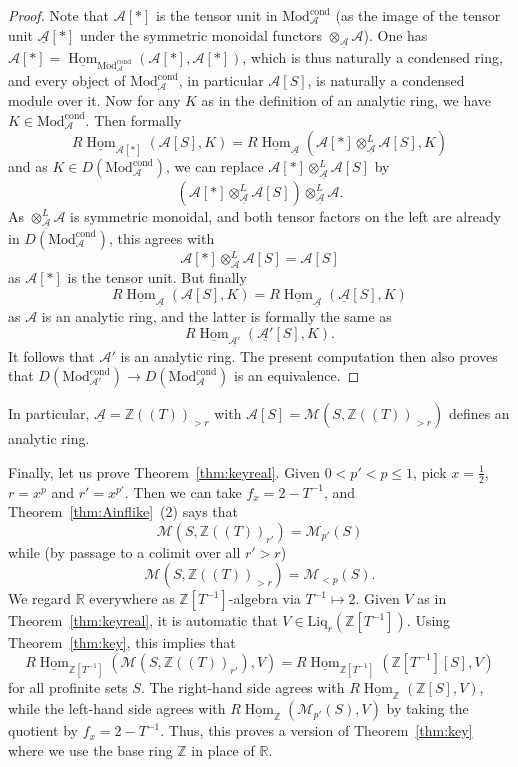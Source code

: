 \documentclass[11pt]{amsbook}
\DeclareMathOperator{\Hom}{Hom}
\newcommand{\intHom}{\underline{\Hom}}
\newcommand{\CondMod}{\mathrm{Mod}^{\mathrm{cond}}}
\numberwithin{equation}{section}
\numberwithin{theorem}{section}
\theoremstyle{definition}
\begin{document}
\begin{proof} Note that $\mathcal A[\ast]$ is the tensor unit in $\CondMod_{\mathcal A}$ (as the image of the tensor unit $\underline{\mathcal A}[\ast]$ under the symmetric monoidal functors $\otimes_{\underline{\mathcal A}} \mathcal A$). One has $\mathcal A[\ast] = \intHom_{\CondMod_{\mathcal A}}(\mathcal A[\ast],\mathcal A[\ast])$, which is thus naturally a condensed ring, and every object of $\CondMod_{\mathcal A}$, in particular $\mathcal A[S]$, is naturally a condensed module over it. Now for any $K$ as in the definition of an analytic ring, we have $K\in \CondMod_{\mathcal A}$. Then formally
\[
R\intHom_{\mathcal A[\ast]}(\mathcal A[S],K) = R\intHom_{\underline{\mathcal A}}(\mathcal A[\ast]\otimes^L_{\underline{\mathcal A}} \mathcal A[S],K)
\]
and as $K\in D(\CondMod_{\mathcal A})$, we can replace $\mathcal A[\ast]\otimes^L_{\underline{\mathcal A}} \mathcal A[S]$ by
\[
(\mathcal A[\ast]\otimes^L_{\underline{\mathcal A}} \mathcal A[S])\otimes^L_{\underline{\mathcal A}} \mathcal A.
\]
As $\otimes^L_{\underline{\mathcal A}} \mathcal A$ is symmetric monoidal, and both tensor factors on the left are already in $D(\CondMod_{\mathcal A})$, this agrees with
\[
\mathcal A[\ast]\otimes^L_{\mathcal A} \mathcal A[S] = \mathcal A[S]
\]
as $\mathcal A[\ast]$ is the tensor unit. But finally
\[
R\intHom_{\underline{\mathcal A}}(\mathcal A[S],K) = R\intHom_{\underline{\mathcal A}}(\underline{\mathcal A}[S],K)
\]
as $\mathcal A$ is an analytic ring, and the latter is formally the same as
\[
R\intHom_{\underline{\mathcal A'}}(\underline{\mathcal A'}[S],K).
\]
It follows that $\mathcal A'$ is an analytic ring. The present computation then also proves that $D(\CondMod_{\mathcal A'})\to D(\CondMod_{\mathcal A})$ is an equivalence.
\end{proof}

In particular, $\underline{\mathcal A}=\mathbb Z((T))_{>r}$ with $\mathcal A[S] = \mathcal M(S,\mathbb Z((T))_{>r})$ defines an analytic ring.

Finally, let us prove Theorem~\ref{thm:keyreal}. Given $0<p'<p\leq 1$, pick $x=\tfrac 12$, $r=x^p$ and $r'=x^{p'}$. Then we can take $f_x=2-T^{-1}$, and Theorem~\ref{thm:Ainflike}~(2) says that
\[
\mathcal M(S,\mathbb Z((T))_{r'})=\mathcal M_{p'}(S)
\]
while (by passage to a colimit over all $r'>r$)
\[
\mathcal M(S,\mathbb Z((T))_{>r}) = \mathcal M_{<p}(S).
\]
We regard $\mathbb R$ everywhere as $\mathbb Z[T^{-1}]$-algebra via $T^{-1}\mapsto 2$. Given $V$ as in Theorem~\ref{thm:keyreal}, it is automatic that $V\in \mathrm{Liq}_r(\mathbb Z[T^{-1}])$. Using Theorem~\ref{thm:key}, this implies that
\[
R\intHom_{\mathbb Z[T^{-1}]}(\mathcal M(S,\mathbb Z((T))_{r'}),V) = R\intHom_{\mathbb Z[T^{-1}]}(\mathbb Z[T^{-1}][S],V)
\]
for all profinite sets $S$. The right-hand side agrees with $R\intHom_{\mathbb Z}(\mathbb Z[S],V)$, while the left-hand side agrees with $R\intHom_{\mathbb Z}(\mathcal M_{p'}(S),V)$ by taking the quotient by $f_x=2-T^{-1}$. Thus, this proves a version of Theorem~\ref{thm:key} where we use the base ring $\mathbb Z$ in place of $\mathbb R$.
\end{document}
